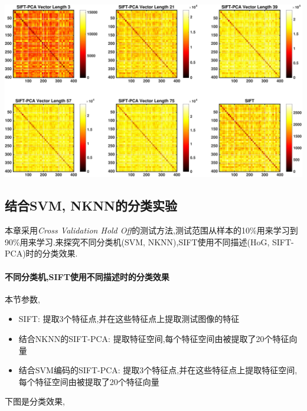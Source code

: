 			\begin{center}
		\begin{minipage}[t]{\linewidth}
		\center
		{
		\includegraphics[width=1.1\textwidth]{Img/c3/sift_dis_mat} 
		}
		\end{minipage}
		\medskip
		\end{center}
		

\subsection{结合SVM, NKNN的分类实验}
本章采用\textit{Cross Validation Hold Off}的测试方法,测试范围从样本的10\%用来学习到90\%用来学习.来探究不同分类机(SVM, NKNN),SIFT使用不同描述(HoG, SIFT-PCA)时的分类效果.\newline

\paragraph{不同分类机,SIFT使用不同描述时的分类效果}
本节参数,\begin{itemize}
	\item SIFT: 提取3个特征点,并在这些特征点上提取测试图像的特征
	\item 结合NKNN的SIFT-PCA: 提取特征空间,每个特征空间由被提取了20个特征向量
	\item 结合SVM编码的SIFT-PCA: 提取3个特征点,并在这些特征点上提取特征空间,每个特征空间由被提取了20个特征向量
\end{itemize}


下图是分类效果,


